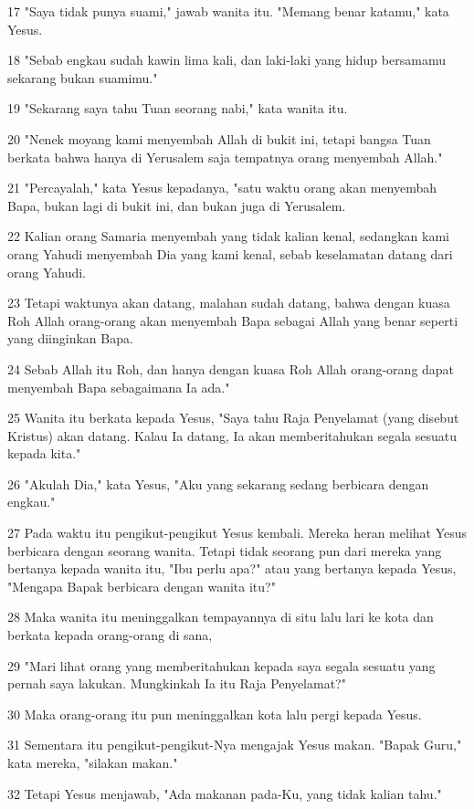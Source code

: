 \par 17 "Saya tidak punya suami," jawab wanita itu. "Memang benar katamu," kata Yesus.
\par 18 "Sebab engkau sudah kawin lima kali, dan laki-laki yang hidup bersamamu sekarang bukan suamimu."
\par 19 "Sekarang saya tahu Tuan seorang nabi," kata wanita itu.
\par 20 "Nenek moyang kami menyembah Allah di bukit ini, tetapi bangsa Tuan berkata bahwa hanya di Yerusalem saja tempatnya orang menyembah Allah."
\par 21 "Percayalah," kata Yesus kepadanya, "satu waktu orang akan menyembah Bapa, bukan lagi di bukit ini, dan bukan juga di Yerusalem.
\par 22 Kalian orang Samaria menyembah yang tidak kalian kenal, sedangkan kami orang Yahudi menyembah Dia yang kami kenal, sebab keselamatan datang dari orang Yahudi.
\par 23 Tetapi waktunya akan datang, malahan sudah datang, bahwa dengan kuasa Roh Allah orang-orang akan menyembah Bapa sebagai Allah yang benar seperti yang diinginkan Bapa.
\par 24 Sebab Allah itu Roh, dan hanya dengan kuasa Roh Allah orang-orang dapat menyembah Bapa sebagaimana Ia ada."
\par 25 Wanita itu berkata kepada Yesus, "Saya tahu Raja Penyelamat (yang disebut Kristus) akan datang. Kalau Ia datang, Ia akan memberitahukan segala sesuatu kepada kita."
\par 26 "Akulah Dia," kata Yesus, "Aku yang sekarang sedang berbicara dengan engkau."
\par 27 Pada waktu itu pengikut-pengikut Yesus kembali. Mereka heran melihat Yesus berbicara dengan seorang wanita. Tetapi tidak seorang pun dari mereka yang bertanya kepada wanita itu, "Ibu perlu apa?" atau yang bertanya kepada Yesus, "Mengapa Bapak berbicara dengan wanita itu?"
\par 28 Maka wanita itu meninggalkan tempayannya di situ lalu lari ke kota dan berkata kepada orang-orang di sana,
\par 29 "Mari lihat orang yang memberitahukan kepada saya segala sesuatu yang pernah saya lakukan. Mungkinkah Ia itu Raja Penyelamat?"
\par 30 Maka orang-orang itu pun meninggalkan kota lalu pergi kepada Yesus.
\par 31 Sementara itu pengikut-pengikut-Nya mengajak Yesus makan. "Bapak Guru," kata mereka, "silakan makan."
\par 32 Tetapi Yesus menjawab, "Ada makanan pada-Ku, yang tidak kalian tahu."
